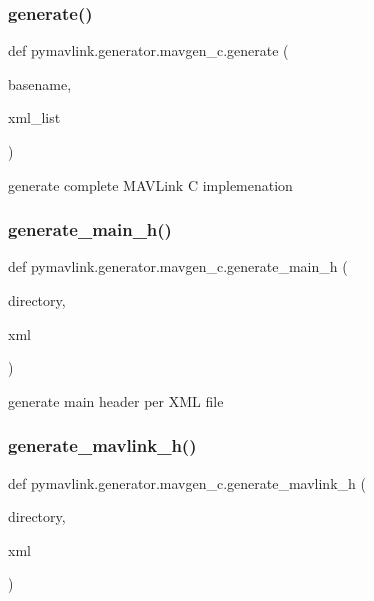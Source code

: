 \subsubsection{\texorpdfstring{generate()}{generate()}}
{\footnotesize\ttfamily def pymavlink.\+generator.\+mavgen\+\_\+c.\+generate (\begin{DoxyParamCaption}\item[{}]{basename,  }\item[{}]{xml\+\_\+list }\end{DoxyParamCaption})}

\begin{DoxyVerb}generate complete MAVLink C implemenation\end{DoxyVerb}
 \mbox{\label{namespacepymavlink_1_1generator_1_1mavgen__c_a09e8fc15eab60988aced8eb66f6f011f}} 
\subsubsection{\texorpdfstring{generate\+\_\+main\+\_\+h()}{generate\_main\_h()}}
{\footnotesize\ttfamily def pymavlink.\+generator.\+mavgen\+\_\+c.\+generate\+\_\+main\+\_\+h (\begin{DoxyParamCaption}\item[{}]{directory,  }\item[{}]{xml }\end{DoxyParamCaption})}

\begin{DoxyVerb}generate main header per XML file\end{DoxyVerb}
 \mbox{\label{namespacepymavlink_1_1generator_1_1mavgen__c_a6386de4b9abb860e912889c7ee80c29d}} 
\subsubsection{\texorpdfstring{generate\+\_\+mavlink\+\_\+h()}{generate\_mavlink\_h()}}
{\footnotesize\ttfamily def pymavlink.\+generator.\+mavgen\+\_\+c.\+generate\+\_\+mavlink\+\_\+h (\begin{DoxyParamCaption}\item[{}]{directory,  }\item[{}]{xml }\end{DoxyParamCaption})}

